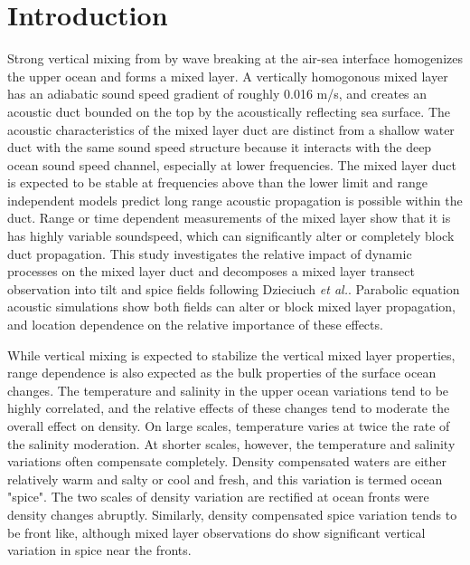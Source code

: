 \documentclass[preprint,NumberedRefs]{JASA}
\begin{document}
\section{\label{sec:intro} Introduction}
Strong vertical mixing from by wave breaking at the air-sea interface homogenizes the upper ocean and forms a mixed layer. A vertically homogonous mixed layer has an adiabatic sound speed gradient of roughly 0.016 m/s, and creates an acoustic duct bounded on the top by the acoustically reflecting sea surface. The acoustic characteristics of the mixed layer duct are distinct from a shallow water duct with the same sound speed structure because it interacts with the deep ocean sound speed channel\citep{porter93}, especially at lower frequencies. The mixed layer duct is expected to be stable at frequencies above than the lower limit\citep{Urick1982Prop} and range independent models predict long range acoustic propagation is possible within the duct. Range or time dependent measurements of the mixed layer show that it is has highly variable soundspeed\citep{cole2010seasonal,rudnick1999compensation,klymak2015}, which can significantly alter or completely block duct propagation\citep{colosi2020observations,colosi21}. This study investigates the relative impact of dynamic processes on the mixed layer duct and decomposes a mixed layer transect observation into tilt and spice fields following Dzieciuch \emph{et al.}\citep{dzieciuch2004}. Parabolic equation acoustic simulations\citep{collins93} show both fields can alter or block mixed layer propagation, and location dependence on the relative importance of these effects.

While vertical mixing is expected to stabilize the vertical mixed layer properties, range dependence is also expected as the bulk properties of the surface ocean changes\citep{ferrari2000}. The temperature and salinity in the upper ocean variations tend to be highly correlated, and the relative effects of these changes tend to moderate the overall effect on density. On large scales, temperature varies at twice the rate of the salinity moderation. At shorter scales, however, the temperature and salinity variations often compensate completely. Density compensated waters are either relatively warm and salty or cool and fresh, and this variation is termed ocean "spice". The two scales of density variation are rectified at ocean fronts were density changes abruptly. Similarly, density compensated spice variation tends to be front like, although mixed layer observations do show significant vertical variation in spice near the fronts.
\end{document}
